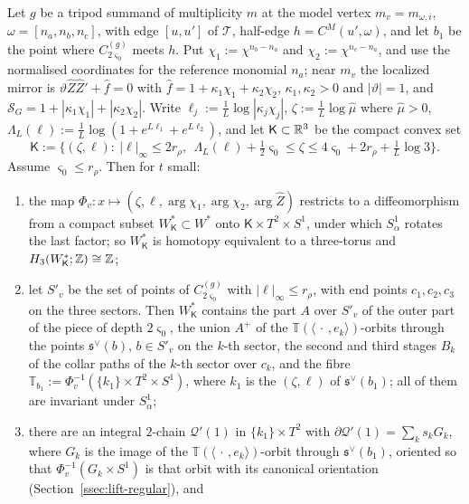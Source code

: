 \begin{lemma}\label{lem:tripodcollar}
Let $g$ be a tripod summand of multiplicity $m$ at the model vertex $m_v=m_{\omega,i}$, $\omega=[n_a,n_b,n_c]$, with edge
$[u,u']$ of $\mathcal T$, half-edge $h=C^M(u',\omega)$, and let $b_1$ be the point where $C^{(g)}_{2\varsigma_0}$ meets $h$.
Put $\chi_1:=\chi^{n_b-n_a}$ and $\chi_2:=\chi^{n_c-n_a}$, and use the normalised coordinates for the reference monomial
$n_a$; near $m_v$ the localized mirror is $\vartheta\hat Z\hat Z'+\hat f=0$ with $\hat f=1+\kappa_1\chi_1+\kappa_2\chi_2$, $\kappa_1,\kappa_2>0$ and $|\vartheta|=1$, and
$\mathcal S_G=1+|\kappa_1\chi_1|+|\kappa_2\chi_2|$. Write $\ell_j:=\frac1L\log|\kappa_j\chi_j|$, $\zeta:=\frac1L\log\hat\mu$
where $\hat\mu>0$, $\Lambda_L(\ell):=\frac1L\log(1+e^{L\ell_1}+e^{L\ell_2})$, and let $\mathsf K\subset\mathbb R^3$ be the compact convex set
\[
\mathsf K:=\bigl\{(\zeta,\ell):\ |\ell|_\infty\le2r_\rho,\ \ \Lambda_L(\ell)+\tfrac12\varsigma_0\le\zeta\le4\varsigma_0+2r_\rho+\tfrac1L\log3\bigr\}.
\]
Assume $\varsigma_0\le r_\rho$. Then for $t$ small:
\begin{enumerate}
\item the map $\Phi_v\colon x\mapsto(\zeta,\ell,\arg\chi_1,\arg\chi_2,\arg\hat Z)$ restricts to a diffeomorphism from a compact
subset $W^*_{\mathsf K}\subset W^*$ onto $\mathsf K\times T^2\times S^1$, under which $S^1_\alpha$ rotates the last factor; so $W^*_{\mathsf K}$ is
homotopy equivalent to a three-torus and $H_3(W^*_{\mathsf K};\mathbb Z)\cong\mathbb Z$;
\item let $S'_v$ be the set of points of $C^{(g)}_{2\varsigma_0}$ with $|\ell|_\infty\le r_\rho$, with end points
$c_1,c_2,c_3$ on the three sectors. Then $W^*_{\mathsf K}$ contains the part $A$ over $S'_v$ of the outer part of the piece of depth
$2\varsigma_0$, the union $A^+$ of the $\mathbb T(\langle\,\cdot\,,e_k\rangle)$-orbits through the points $\mathfrak s^\vee(b)$,
$b\in S'_v$ on the $k$-th sector, the second and third stages $B_k$ of the collar paths of the $k$-th sector over $c_k$,
and the fibre $\mathbb T_{b_1}:=\Phi_v^{-1}(\{k_1\}\times T^2\times S^1)$, where $k_1$ is the $(\zeta,\ell)$ of
$\mathfrak s^\vee(b_1)$; all of them are invariant under $S^1_\alpha$;
\item there are an integral $2$-chain $\mathcal Q'(1)$ in $\{k_1\}\times T^2$ with $\partial\mathcal Q'(1)=\sum_ks_kG_k$, where
$G_k$ is the image of the $\mathbb T(\langle\,\cdot\,,e_k\rangle)$-orbit through $\mathfrak s^\vee(b_1)$, oriented so that
$\Phi_v^{-1}(G_k\times S^1)$ is that orbit with its canonical orientation (Section~\ref{ssec:lift-regular}), and

\end{enumerate}
\end{lemma}
